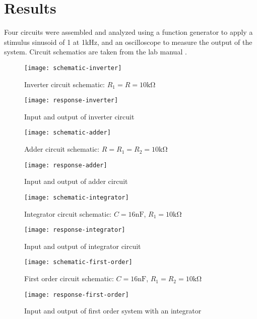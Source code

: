 \section{Results}\label{sec:results}
Four circuits were assembled and analyzed using a function generator to apply a stimulus sinusoid of 1\si{\voltpp} at 1\si{\kilo\hertz}, and an oscilloscope to measure the output of the system. Circuit schematics are taken from the lab manual \cite{lab-manual}.

\begin{figure}[htbp]
	\centering
	\texttt{[image: schematic-inverter]}
	\label{fig:schem-inverter}
	\caption{Inverter circuit schematic: $R_1=R=10\si{\kilo\ohm}$}
\end{figure}
\begin{figure}[htbp]
	\centering
	\texttt{[image: response-inverter]}
	\label{fig:inverter}
	\caption{Input and output of inverter circuit}
\end{figure}

\begin{figure}[htbp]
	\centering
	\texttt{[image: schematic-adder]}
	\label{fig:schem-adder}
	\caption{Adder circuit schematic: $R=R_1=R_2=10\si{\kilo\ohm}$}
\end{figure}
\begin{figure}[htbp]
	\centering
	\texttt{[image: response-adder]}
	\label{fig:adder}
	\caption{Input and output of adder circuit}
\end{figure}

\begin{figure}[htbp]
	\centering
	\texttt{[image: schematic-integrator]}
	\label{fig:schem-integrator}
	\caption{Integrator circuit schematic: $C=16\si{\nano\farad}$, $R_1=10\si{\kilo\ohm}$}
\end{figure}
\begin{figure}[htbp]
	\centering
	\texttt{[image: response-integrator]}
	\label{fig:integrator}
	\caption{Input and output of integrator circuit}
\end{figure}

\begin{figure}[htbp]
	\centering
	\texttt{[image: schematic-first-order]}
	\label{fig:schem-first-order}
	\caption{First order circuit schematic: $C=16\si{\nano\farad}$, $R_1=R_2=10\si{\kilo\ohm}$}
\end{figure}
\begin{figure}
	\centering
	\texttt{[image: response-first-order]}
	\label{fig:first-order}
	\caption{Input and output of first order system with an integrator}
\end{figure}

\clearpage
